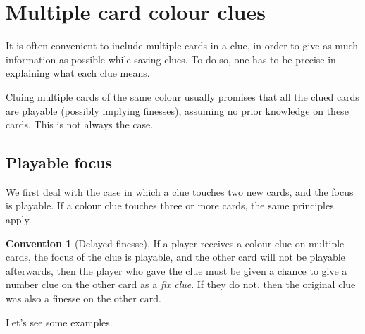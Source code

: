 \documentclass[a4paper]{article}
\theoremstyle{plain}
\theoremstyle{definition}
\newtheorem{convention}[theorem]{Convention}
\begin{document}
\section{Multiple card colour clues}

It is often convenient to include multiple cards in a clue, in order to give as much information as possible while saving clues. To do so, one has to be precise in explaining what each clue means.

Cluing multiple cards of the same colour usually promises that all the clued cards are playable (possibly implying finesses), assuming no prior knowledge on these cards. This is not always the case.

\subsection{Playable focus}

We first deal with the case in which a clue touches two new cards, and the focus is playable. If a colour clue touches three or more cards, the same principles apply.

\begin{convention}[Delayed finesse]
	\label{delayed-finesse}
	If a player receives a colour clue on multiple cards, the focus of the clue is playable, and the other card will not be playable afterwards, then the player who gave the clue must be given a chance to give a number clue on the other card as a \emph{fix clue}. If they do not, then the original clue was also a finesse on the other card.
\end{convention}

Let's see some examples.
\end{document}
